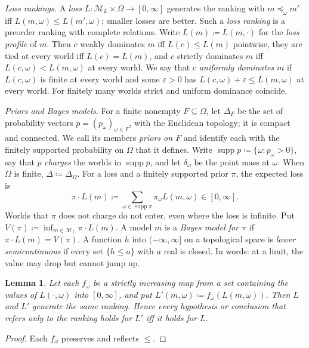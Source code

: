 \documentclass[11pt]{article}
\newtheorem{lemma}[theorem]{Lemma}
\theoremstyle{definition}
\theoremstyle{remark}
\newcommand{\M}{\mathcal M}
\newcommand{\supp}{\operatorname{supp}}
\begin{document}
\emph{Loss rankings.} A \emph{loss} $L:\M_L\times\Omega\to[0,\infty]$ generates the ranking with $m\preceq_\omega m'$ iff $L(m,\omega)\le L(m',\omega)$; smaller losses are better. Such a \emph{loss ranking} is a preorder ranking with complete relations. Write $L(m)\coloneqq L(m,\cdot)$ for the \emph{loss profile} of $m$. Then $c$ weakly dominates $m$ iff $L(c)\le L(m)$ pointwise, they are tied at every world iff $L(c)=L(m)$, and $c$ strictly dominates $m$ iff $L(c,\omega)<L(m,\omega)$ at every world. We say that $c$ \emph{uniformly dominates} $m$ if $L(c,\omega)$ is finite at every world and some $\varepsilon>0$ has $L(c,\omega)+\varepsilon\le L(m,\omega)$ at every world. For finitely many worlds strict and uniform dominance coincide.

\emph{Priors and Bayes models.} For a finite nonempty $F\subseteq\Omega$, let $\Delta_F$ be the set of probability vectors $p=(p_\omega)_{\omega\in F}$, with the Euclidean topology; it is compact and connected. We call its members \emph{priors on $F$} and identify each with the finitely supported probability on $\Omega$ that it defines. Write $\supp p\coloneqq\{\omega:p_\omega>0\}$, say that $p$ \emph{charges} the worlds in $\supp p$, and let $\delta_\omega$ be the point mass at $\omega$. When $\Omega$ is finite, $\Delta\coloneqq\Delta_\Omega$. For a loss and a finitely supported prior $\pi$, the expected loss is
\[
\pi\cdot L(m)\coloneqq\sum_{\omega\in\supp\pi}\pi_\omega L(m,\omega)\in[0,\infty].
\]
Worlds that $\pi$ does not charge do not enter, even where the loss is infinite. Put $V(\pi)\coloneqq\inf_{m\in\M_L}\pi\cdot L(m)$. A model $m$ is a \emph{Bayes model for $\pi$} if $\pi\cdot L(m)=V(\pi)$. A function $h$ into $(-\infty,\infty]$ on a topological space is \emph{lower semicontinuous} if every set $\{h\le a\}$ with $a$ real is closed. In words: at a limit, the value may drop but cannot jump up.

\begin{lemma}\label{lem:rescale}
Let each $f_\omega$ be a strictly increasing map from a set containing the values of $L(\cdot,\omega)$ into $[0,\infty]$, and put $L'(m,\omega)\coloneqq f_\omega(L(m,\omega))$. Then $L$ and $L'$ generate the same ranking. Hence every hypothesis or conclusion that refers only to the ranking holds for $L'$ iff it holds for $L$.
\end{lemma}
\begin{proof}
Each $f_\omega$ preserves and reflects $\le$.
\end{proof}
\end{document}
